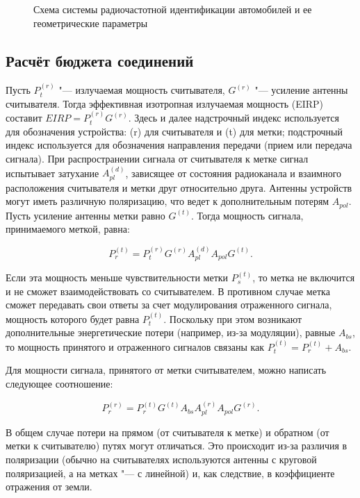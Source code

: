 \begin{figure}[h]
	\caption{Схема системы радиочастотной идентификации автомобилей и ее геометрические параметры}
	\label{fig:ch2_geometry}
\end{figure}



\subsection{Расчёт бюджета соединений}
Пусть $P_t^{(r)}$ "--- излучаемая мощность считывателя, $G^{(r)}$ "--- усиление антенны считывателя. Тогда эффективная изотропная излучаемая мощность (EIRP) составит $EIRP =  P_t^{(r)} G^{(r)}$. Здесь и далее надстрочный индекс используется для обозначения устройства: (r) для считывателя и (t) для метки; подстрочный индекс используется для обозначения направления передачи (прием или передача сигнала). При распространении сигнала от считывателя к метке сигнал испытывает затухание $A_{pl}^{(d)}$, зависящее от состояния радиоканала и взаимного расположения считывателя и метки друг относительно друга. Антенны устройств могут иметь различную поляризацию, что ведет к дополнительным потерям $A_{pol}$. Пусть усиление антенны метки равно $G^{(t)}$. Тогда мощность сигнала, принимаемого меткой, равна:

$$
	P_r^{(t)} = P_t^{(r)} G^{(r)} A_{pl}^{(d)} A_{pol} G^{(t)}.
$$

Если эта мощность меньше чувствительности метки $P_s^{(t)}$, то метка не включится и не сможет взаимодействовать со считывателем. В противном случае метка сможет передавать свои ответы за счет модулирования отраженного сигнала, мощность которого будет равна $P_t^{(t)}$. Поскольку при этом возникают дополнительные энергетические потери (например, из-за модуляции), равные $A_{bs}$, то мощность принятого и отраженного сигналов связаны как $P_t^{(t)} = P_r^{(t)} + A_{bs}$.

Для мощности сигнала, принятого от метки считывателем, можно написать следующее соотношение:

$$
	P_r^{(r)} = P_r^{(t)} G^{(t)} A_{bs} A_{pl}^{(r)} A_{pol} G^{(r)}.
$$

В общем случае потери на прямом (от считывателя к метке) и обратном (от метки к считывателю) путях могут отличаться. Это происходит из-за различия в поляризации (обычно на считывателях используются антенны с круговой поляризацией, а на метках "--- с линейной) и, как следствие, в коэффициенте отражения от земли.

